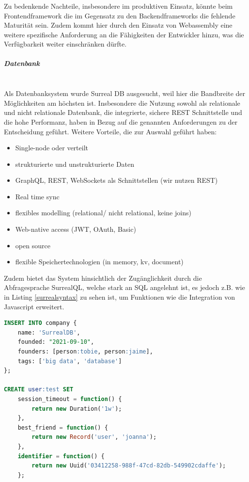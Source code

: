 \documentclass[notitlepage, hidelinks]{article}
\begin{document}
Zu bedenkende Nachteile, insbesondere im produktiven Einsatz, könnte beim Frontendframework die im Gegensatz zu den Backendframeworks die fehlende Maturität sein. Zudem kommt hier durch den Einsatz von Webassembly eine weitere spezifische Anforderung an die Fähigkeiten der Entwickler hinzu, was die Verfügbarkeit weiter einschränken dürfte.

\subparagraph{Datenbank} \mbox{} \\
Als Datenbanksystem wurde Surreal DB ausgesucht, weil hier die Bandbreite der Möglichkeiten am höchsten ist. Insbesondere die Nutzung sowohl als relationale und nicht relationale Datenbank, die integrierte, sichere REST Schnittstelle und die hohe Performanz, haben in Bezug auf die genannten Anforderungen zu der Entscheidung geführt. Weitere Vorteile, die zur Auswahl geführt haben:
\begin{itemize}
\item Single-node oder verteilt
\item strukturierte und unstrukturierte Daten
\item GraphQL, REST, WebSockets als Schnittstellen (wir nutzen REST)
\item Real time sync
\item flexibles modelling (relational/ nicht relational, keine joins)
\item Web-native access (JWT, OAuth, Basic)
\item open source
\item flexible Speichertechnologien (in memory, kv, document)
\end{itemize}

Zudem bietet das System hinsichtlich der Zugänglichkeit durch die Abfragesprache SurrealQL, welche stark an SQL angelehnt ist, es jedoch z.B. wie in Listing \ref{surrealsyntax} zu sehen ist, um Funktionen wie die Integration von Javascript erweitert.

\begin{lstlisting}[language=SQL,frame=single,caption=SQL ähnliche Syntax in Surreal DB,label=surrealsyntax]
INSERT INTO company {
	name: 'SurrealDB',
	founded: "2021-09-10",
	founders: [person:tobie, person:jaime],
	tags: ['big data', 'database']
};

CREATE user:test SET
	session_timeout = function() {
		return new Duration('1w');
	},
	best_friend = function() {
		return new Record('user', 'joanna');
	},
	identifier = function() {
		return new Uuid('03412258-988f-47cd-82db-549902cdaffe');
	};
\end{lstlisting}
\end{document}

